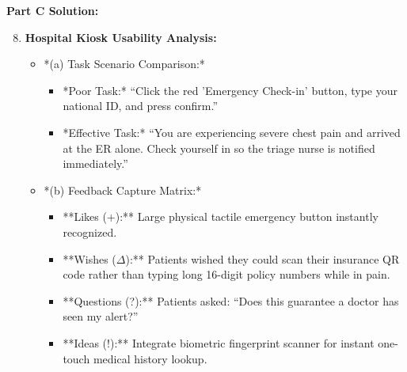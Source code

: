 \begin{solutionbox}
\textbf{Part C Solution:}
\begin{enumerate}[leftmargin=1.2em, itemsep=3pt]
    \setcounter{enumi}{7}
    \item \textbf{Hospital Kiosk Usability Analysis:}
    \begin{itemize}
        \item *(a) Task Scenario Comparison:*
        \begin{itemize}
            \item *Poor Task:* ``Click the red 'Emergency Check-in' button, type your national ID, and press confirm.''
            \item *Effective Task:* ``You are experiencing severe chest pain and arrived at the ER alone. Check yourself in so the triage nurse is notified immediately.''
        \end{itemize}
        \item *(b) Feedback Capture Matrix:*
        \begin{itemize}
            \item **Likes (+):** Large physical tactile emergency button instantly recognized.
            \item **Wishes ($\Delta$):** Patients wished they could scan their insurance QR code rather than typing long 16-digit policy numbers while in pain.
            \item **Questions (?):** Patients asked: ``Does this guarantee a doctor has seen my alert?''
            \item **Ideas (!):** Integrate biometric fingerprint scanner for instant one-touch medical history lookup.
        \end{itemize}
    \end{itemize}
\end{enumerate}
\end{solutionbox}
